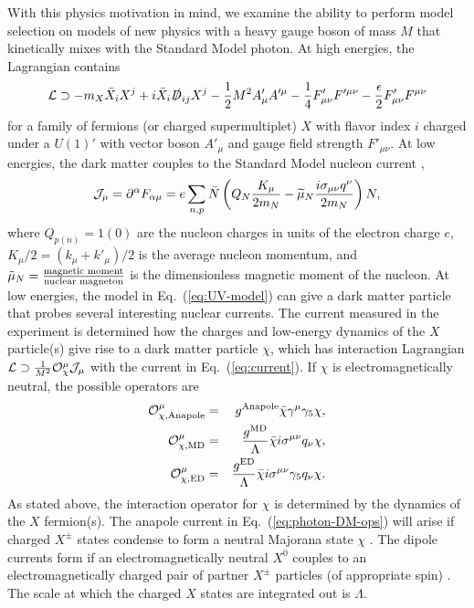 \documentclass[11pt]{article}
\newcommand{\pL}{\left(} \newcommand{\pR}{\right)} \newcommand{\bL}{\left[} \newcommand{\bR}{\right]} \newcommand{\cbL}{\left\{} \newcommand{\cbR}{\right\}} \newcommand{\mL}{\left|} \newcommand{\mR}{\right|}
\newcommand{\beq}{\begin{equation}} \newcommand{\eeq}{\end{equation}}
\newcommand{\Eq}[1]{Eq.~(\ref{#1})} \newcommand{\Eqs}[2]{Eqs.~(\ref{#1}) and (\ref{#2})} \newcommand{\Eqm}[2]{Eqs.~(\ref{#1}) through (\ref{#2})}
\begin{document}
With this physics motivation in mind, we examine the ability to perform model selection on models of new physics with a heavy gauge boson of mass $M$ that kinetically mixes with the Standard Model photon. At high energies, the Lagrangian contains
\beq \label{eq:UV-model}
\cL \supset -  m_X \bar X_i X^j + i \bar X_i \slashed D_{ij} X^j  - \frac12 M^2 A'_\mu A'^\mu  - \frac14 F'_{\mu \nu} F'^{\mu \nu} - \frac\epsilon2 F'_{\mu \nu} F^{\mu \nu}
\eeq
for a family of fermions (or charged supermultiplet) $X$ with flavor index $i$ charged under a $U(1)'$ with vector boson $A'_\mu$ and gauge field strength $F'_{\mu \nu}$. At low energies, the dark matter couples to the Standard Model nucleon current \cite{Gresham:2014vja},
\beq \label{eq:current}
\cJ_\mu = \partial^\alpha F_{\alpha \mu} = e \sum_{n,p} \bar N \pL Q_N \frac{K_\mu}{2m_N} -\widetilde \mu_N \frac{i \sigma_{\mu \nu}q^\nu}{2m_N} \pR N,
\eeq 
where $Q_{p(n)}=1(0)$ are the nucleon charges in units of the electron charge $e$, $K_\mu/2 = (k_\mu + k'_\mu)/2$ is the average nucleon momentum, and $\tilde{\mu}_N = {\text{magnetic moment} \over \text{nuclear magneton}}$ is the dimensionless magnetic moment of the nucleon. At low energies, the model in \Eq{eq:UV-model} can give a dark matter particle that probes several interesting nuclear currents. The current measured in the experiment is determined how the charges and low-energy dynamics of the $X$ particle(s) give rise to a dark matter particle $\chi$, which has interaction Lagrangian ${\cal L} \supset \frac1{M^2} {\cal O}_\chi^\mu {\cal J}_\mu$ with the current in \Eq{eq:current}. If $\chi$ is electromagnetically neutral, the possible operators are \cite{Gresham:2014vja, Gluscevic:2015sqa}
\begin{eqnarray} \label{eq:photon-DM-ops}
{\cal O}_{\rm \chi, Anapole}^\mu & = & g^{\rm Anapole}\bar \chi \gamma^\mu \gamma_5 \chi, \\
{\cal O}_{\rm \chi, MD}^\mu & = & \frac{g^{\rm MD}}{\Lambda}\bar \chi i \sigma^{\mu \nu} q_\nu \chi ,\\
{\cal O}_{\rm \chi, ED}^\mu & = & \frac{g^{\rm ED}}{\Lambda} \bar \chi i \sigma^{\mu \nu} \gamma_5 q_\nu \chi.
\end{eqnarray}
As stated above, the interaction operator for $\chi$ is determined by the dynamics of the $X$ fermion(s). The anapole current in \Eq{eq:photon-DM-ops} will arise if charged $X^\pm$ states condense to form a neutral Majorana state $\chi$ \cite{Bagnasco:1993st}. The dipole currents form if an electromagnetically neutral $X^0$ couples to an electromagnetically charged pair of partner $X^\pm$ particles (of appropriate spin) \cite{Weiner:2012gm}. The scale at which the charged $X$ states are integrated out is $\Lambda$.
\end{document}
